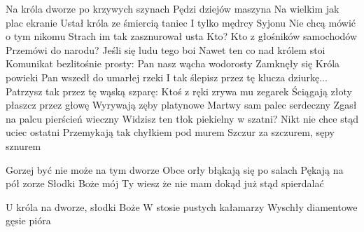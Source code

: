 \documentclass[../../../songbook.tex]{subfiles}
\begin{document}
\begin{multicols}{2}
{Na króla dworze po krzywych szynach \newline
Pędzi dziejów maszyna \newline
Na wielkim jak plac ekranie \newline
Ustał króla ze śmiercią taniec  \newline
I tylko mędrcy Syjonu \newline
Nie chcą mówić o tym nikomu \newline
Strach im tak zasznurował usta \newline
Kto? Kto z głośników samochodów \newline
Przemówi do narodu? \newline
Jeśli się ludu tego boi \newline
Nawet ten co nad królem stoi \newline
Komunikat bezlitośnie prosty: \newline
Pan nasz wącha wodorosty \newline
Zamknęły się Króla powieki \newline
Pan wszedł do umarłej rzeki \newline
I tak ślepisz przez tę klucza dziurkę... \newline
Patrzysz tak przez tę wąską szparę:  \newline
Ktoś z ręki zrywa mu zegarek \newline
Ściągają złoty płaszcz przez głowę \newline
Wyrywają zęby platynowe \newline
Martwy sam palec serdeczny \newline
Zgasł na palcu pierścień wieczny \newline
Widzisz ten tłok piekielny w szatni? \newline
Nikt nie chce stąd uciec ostatni \newline
Przemykają tak chyłkiem pod murem \newline
Szczur za szczurem, sępy sznurem \newline

\-\hspace{0.4cm} Gorzej być nie może  na tym dworze \newline
\-\hspace{0.4cm} Obce orły błąkają się po salach \newline
\-\hspace{0.4cm} Pękają na pół zorze \newline
\-\hspace{0.4cm} Słodki Boże mój \newline
\-\hspace{0.4cm} Ty wiesz że nie mam dokąd już stąd spierdalać \newline

U króla na dworze, słodki Boże \newline
W stosie pustych kałamarzy  \newline
Wyschły diamentowe gęsie pióra  \newline

}
\end{multicols}
\end{document}
